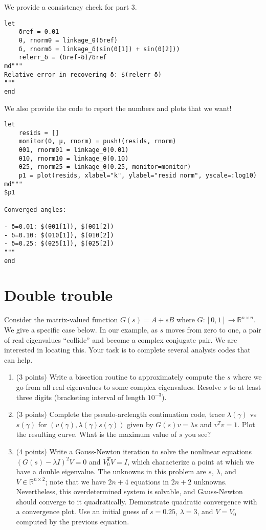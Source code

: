 \documentclass[12pt, leqno]{article} %
\providecommand{\tightlist}{%
  \setlength{\itemsep}{0pt}\setlength{\parskip}{0pt}}
\begin{document}
We provide a consistency check for part 3.

\begin{verbatim}
let
    δref = 0.01
    θ, rnormθ = linkage_θ(δref)
    δ, rnormδ = linkage_δ(sin(θ[1]) + sin(θ[2]))
    relerr_δ = (δref-δ)/δref
md"""
Relative error in recovering δ: $(relerr_δ)
"""
end
\end{verbatim}

We also provide the code to report the numbers and plots that we want!

\begin{verbatim}
let
    resids = []
    monitor(θ, μ, rnorm) = push!(resids, rnorm)
    θ01, rnorm01 = linkage_θ(0.01)
    θ10, rnorm10 = linkage_θ(0.10)
    θ25, rnorm25 = linkage_θ(0.25, monitor=monitor)
    p1 = plot(resids, xlabel="k", ylabel="resid norm", yscale=:log10)
md"""
$p1

Converged angles:

- δ=0.01: $(θ01[1]), $(θ01[2])
- δ=0.10: $(θ10[1]), $(θ10[2])
- δ=0.25: $(θ25[1]), $(θ25[2])
"""
end
\end{verbatim}


\section{Double trouble}

Consider the matrix-valued function \(G(s) = A+sB\) where
\(G : [0,1] \rightarrow \mathbb{R}^{n \times n}\). We give a specific
case below. In our example, as \(s\) moves from zero to one, a pair of
real eigenvalues ``collide'' and become a complex conjugate pair. We are
interested in locating this. Your task is to complete several analysis
codes that can help.

\begin{enumerate}
\def\labelenumi{\arabic{enumi}.}
\tightlist
\item
  (3 points) Write a bisection routine to approximately compute the
  \(s\) where we go from all real eigenvalues to some complex
  eigenvalues. Resolve \(s\) to at least three digits (bracketing
  interval of length \(10^{-3}\)).
\item
  (3 points) Complete the pseudo-arclength continuation code, trace
  \(\lambda(\gamma)\) vs \(s(\gamma)\) for
  \((v(\gamma), \lambda(\gamma) s(\gamma))\) given by
  \(G(s) v = \lambda s\) and \(v^T v = 1\). Plot the resulting curve.
  What is the maximum value of \(s\) you see?
\item
  (4 points) Write a Gauss-Newton iteration to solve the nonlinear
  equations \((G(s)-\lambda I)^2 V = 0\) and \(V_0^T V = I\), which
  characterize a point at which we have a double eigenvalue. The
  unknowns in this problem are \(s\), \(\lambda\), and
  \(V \in \mathbb{R}^{n \times 2}\); note that we have \(2n+4\)
  equations in \(2n+2\) unknowns. Nevertheless, this overdetermined
  system is solvable, and Gauss-Newton should converge to it
  quadratically. Demonstrate quadratic convergence with a convergence
  plot. Use an initial guess of \(s = 0.25\), \(\lambda = 3\), and
  \(V = V_0\) computed by the previous equation.
\end{enumerate}
\end{document}

